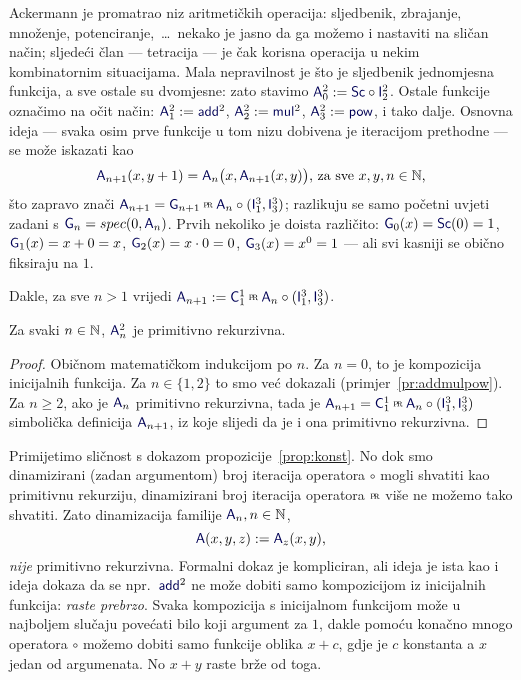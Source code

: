 Ackermann je promatrao niz aritmetičkih operacija: sljedbenik, zbrajanje, množenje, potenciranje,~\ldots\ nekako je jasno da ga možemo i nastaviti na sličan način; sljedeći član --- tetracija --- je čak korisna operacija u nekim kombinatornim situacijama. Mala nepravilnost je što je sljedbenik jednomjesna funkcija, a sve ostale su dvomjesne: zato stavimo $\f A_0^2:=\f{Sc}\circ \f I_2^2$. Ostale funkcije označimo na očit način: $\f A_1^2:=\f{add}^2$, $\f A_2^2:=\f{mul}^2$, $\f A_3^2:=\f{pow}$, i tako dalje. Osnovna ideja --- svaka osim prve funkcije u tom nizu dobivena je iteracijom prethodne --- se može iskazati kao
\begin{equation}\label{eq:A2SSdef}
    \f A_{n+1}(x,y+1)=\f A_n\bigl(x,\f A_{n+1}(x,y)\bigr)\text{, za sve }x,y,n\in\N\text,
\end{equation}
što zapravo znači $\f A_{n+1}=\f G_{n+1}\pr\f A_n\circ(\f I_1^3,\f I_3^3)$; razlikuju se samo početni uvjeti zadani s $\f G_n=spec(0,\f A_n)$. Prvih nekoliko je doista različito: $\f G_0(x)=\f{Sc}(0)=1$, $\f G_1(x)=x+0=x$, $\f G_2(x)=x\cdot 0=0$, $\f G_3(x)=x^0=1$ --- ali svi kasniji se obično fiksiraju na $1$.

Dakle, za sve $n>1$ vrijedi $\f A_{n+1}:=\f C_1^1\pr\f A_n\circ(\f I_1^3,\f I_3^3)$.

\begin{propozicija}[{name=[primitivna rekurzivnost generaliziranih aritmetičkih operacija]}]\label{pp:Anprn}
    Za svaki $n\in{\mathbb N}$, $\f A_n^2$ je primitivno rekurzivna.
\end{propozicija}
\begin{proof}
Običnom matematičkom indukcijom po $n$. Za $n=0$, to je kompozicija inicijalnih funkcija. Za $n\in\{1,2\}$ to smo već dokazali (primjer~\ref{pr:addmulpow}). Za $n\ge 2$, ako je $\f A_n$ primitivno rekurzivna, tada je $\f A_{n+1}=\f C_1^1\pr\f A_n\circ(\f I_1^3,\f I_3^3)$ simbolička definicija $\f A_{n+1}$, iz koje slijedi da je i ona primitivno rekurzivna.
\end{proof}

Primijetimo sličnost s dokazom propozicije~\ref{prop:konst}. No dok smo dinamizirani (zadan argumentom) broj iteracija operatora $\circ$ mogli shvatiti kao primitivnu rekurziju, dinamizirani broj iteracija operatora $\pr$ više ne možemo tako shvatiti. Zato dinamizacija familije $\f A_n,n\in\N$,
\begin{equation}
    \f A(x,y,z):=\f A_z(x,y)\text,
\end{equation}
\emph{nije} primitivno rekurzivna. Formalni dokaz je kompliciran, ali ideja je ista kao i ideja dokaza da se npr.\ $\f{add}^2$ ne može dobiti samo kompozicijom iz inicijalnih funkcija: \emph{raste prebrzo}. Svaka kompozicija s inicijalnom funkcijom može u najboljem slučaju povećati bilo koji argument za $1$, dakle pomoću konačno mnogo operatora $\circ$ možemo dobiti samo funkcije oblika $x+c$, gdje je $c$ konstanta a $x$ jedan od argumenata. No $x+y$ raste brže od toga.

